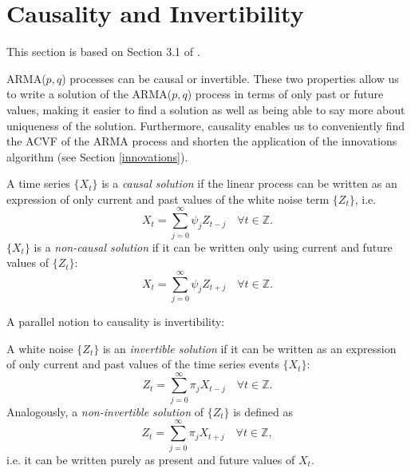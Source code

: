 \documentclass[a4paper, oneside]{discothesis}
\begin{document}
\section{Causality and Invertibility}

This section is based on Section 3.1 of \cite{itsf}.

ARMA($p,q$) processes can be causal or invertible. These two properties allow us to write a solution of the ARMA($p,q$) process in terms of only past or future values, making it easier to find a solution as well as being able to say more about uniqueness of the solution. Furthermore, causality enables us to conveniently find the ACVF of the ARMA process and shorten the application of the innovations algorithm (see Section \ref{innovations}).

\begin{definition}
    A time series $\{X_t\}$ is a \textit{causal solution} if the linear process can be written as an expression of only current and past values of the white noise term $\{Z_t\}$, i.e.
    \begin{equation} \label{eq:causal}
        X_t = \sum_{j=0}^\infty \psi_j Z_{t-j} \quad \forall t \in \mathbb{Z}.
    \end{equation}
    $\{X_t\}$ is a \textit{non-causal solution} if it can be written only using current and future values of $\{Z_t\}$:
    \begin{equation*}
        X_t = \sum_{j=0}^\infty \psi_j Z_{t+j} \quad \forall t \in \mathbb{Z}.
    \end{equation*}
\end{definition}

A parallel notion to causality is invertibility:

\begin{definition}
    A white noise $\{Z_t\}$ is an \textit{invertible solution} if it can be written as an expression of only current and past values of the time series events $\{X_t\}$:
    \begin{equation*}
        Z_t = \sum_{j=0}^\infty \pi_j X_{t-j} \quad \forall t \in \mathbb{Z}.
    \end{equation*}
    Analogously, a \textit{non-invertible solution} of $\{Z_t\}$ is defined as
    \begin{equation*}
        Z_t = \sum_{j=0}^\infty \pi_j X_{t+j} \quad \forall t \in \mathbb{Z},
    \end{equation*}
    i.e. it can be written purely as present and future values of $X_t$.
\end{definition}
\end{document}
